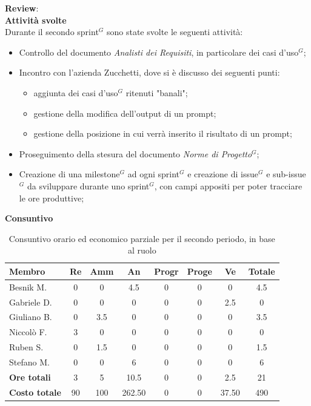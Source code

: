 \documentclass[a4paper,10pt]{article}
\begin{document}
\textbf{Review}: \\
\textbf{Attività svolte}\\
Durante il secondo sprint$^G$ sono state svolte le seguenti attività:
\begin{itemize}
  \item Controllo del documento \textit{Analisti dei Requisiti}, in particolare dei casi d'uso$^G$;
  \item Incontro con l'azienda Zucchetti, dove si è discusso dei seguenti punti:
  \begin{itemize}
    \item aggiunta dei casi d'uso$^G$ ritenuti "banali";
    \item gestione della modifica dell'output di un prompt;
    \item gestione della posizione in cui verrà inserito il risultato di un prompt;
  \end{itemize}
  \item Proseguimento della stesura del documento \textit{Norme di Progetto$^G$};
  \item Creazione di una milestone$^G$ ad ogni sprint$^G$ e creazione di issue$^G$ e sub-issue$^G$ da sviluppare durante uno sprint$^G$, con campi appositi per poter tracciare le ore produttive; 
\end{itemize}
\textbf{Consuntivo}
\begin{table}[H]
\centering
\begin{tabular}{|l|c|c|c|c|c|c|c|}
\hline
\textbf{Membro} & \textbf{Re} & \textbf{Amm} & \textbf{An} & \textbf{Progr} & \textbf{Proge} & \textbf{Ve} & \textbf{Totale} \\
\hline
Besnik M.  & 0 & 0 & 4.5 & 0 & 0 & 0 & 4.5 \\
Gabriele D. & 0 & 0 & 0 & 0 & 0 & 2.5 & 0 \\
Giuliano B. & 0 & 3.5 & 0 & 0 & 0 & 0 & 3.5 \\
Niccolò F.  & 3 & 0 & 0 & 0 & 0 & 0 & 0 \\
Ruben S. & 0 & 1.5 & 0 & 0 & 0 & 0 & 1.5 \\
Stefano M. & 0 & 0 & 6 & 0 & 0 & 0 & 6 \\
\hline
\textbf{Ore totali} & 3 & 5 & 10.5 & 0 & 0 & 2.5 & 21 \\
\hline
\textbf{Costo totale} & 90 & 100 & 262.50 & 0 & 0 & 37.50 & 490 \\
\hline
\end{tabular}
\caption{Consuntivo orario ed economico parziale per il secondo periodo, in base al ruolo}
\end{table}
\end{document}
